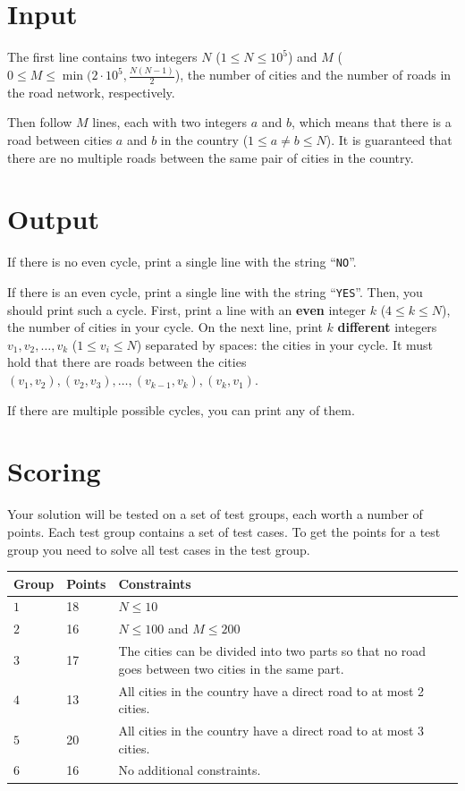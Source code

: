 \section*{Input}
The first line contains two integers $N$ ($1 \le N \le 10^5$) and $M$ ($0 \le M \le \min(2 \cdot 10^5, \frac{N(N-1)}{2}$), the number of cities and the number of roads in the road network, respectively.

Then follow $M$ lines, each with two integers $a$ and $b$, which means that there is a road between cities $a$ and $b$ in the country ($1 \le a \neq b \le N$).
It is guaranteed that there are no multiple roads between the same pair of cities in the country.

\section*{Output}
If there is no even cycle, print a single line with the string ``\texttt{NO}''.

If there is an even cycle, print a single line with the string ``\texttt{YES}''.
Then, you should print such a cycle.
First, print a line with an \textbf{even} integer $k$ ($4 \le k \le N$), the number of cities in your cycle.
On the next line, print $k$ \textbf{different} integers $v_{1}, v_{2}, \ldots, v_{k}$ ($1 \le v_{i} \le N$) separated by spaces: the cities in your cycle.
It must hold that there are roads between the cities $(v_{1}, v_{2}), (v_{2}, v_{3}), \ldots, (v_{k-1}, v_{k}), (v_{k}, v_{1})$.

If there are multiple possible cycles, you can print any of them.

\section*{Scoring}
Your solution will be tested on a set of test groups, each worth a number of points. Each test group contains
a set of test cases. To get the points for a test group you need to solve all test cases in the test group.

\noindent
\begin{tabular}{| l | l | l |}
  \hline
  \textbf{Group} & \textbf{Points} & \textbf{Constraints} \\ \hline
  $1$ & 18 & $N \le 10$ \\ \hline
  $2$ & 16 & $N \le 100$ and $M \le 200$ \\ \hline
  $3$ & 17 & The cities can be divided into two parts so that no road goes between two cities in the same part. \\ \hline
  $4$ & 13 & All cities in the country have a direct road to at most 2 cities. \\ \hline
  $5$ & 20 & All cities in the country have a direct road to at most 3 cities. \\ \hline
  $6$ & 16 & No additional constraints. \\ \hline
\end{tabular}


